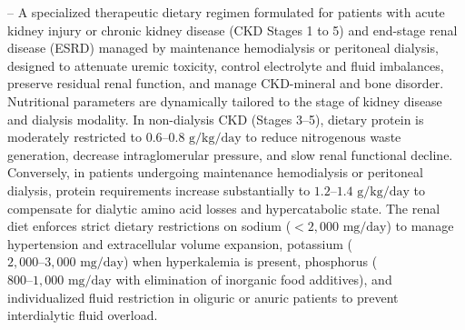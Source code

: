 -- A specialized therapeutic dietary regimen formulated for patients with acute kidney injury or chronic kidney disease (CKD Stages 1 to 5) and end-stage renal disease (ESRD) managed by maintenance hemodialysis or peritoneal dialysis, designed to attenuate uremic toxicity, control electrolyte and fluid imbalances, preserve residual renal function, and manage CKD-mineral and bone disorder. Nutritional parameters are dynamically tailored to the stage of kidney disease and dialysis modality. In non-dialysis CKD (Stages 3--5), dietary protein is moderately restricted to $0.6\text{--}0.8\text{ g/kg/day}$ to reduce nitrogenous waste generation, decrease intraglomerular pressure, and slow renal functional decline. Conversely, in patients undergoing maintenance hemodialysis or peritoneal dialysis, protein requirements increase substantially to $1.2\text{--}1.4\text{ g/kg/day}$ to compensate for dialytic amino acid losses and hypercatabolic state. The renal diet enforces strict dietary restrictions on sodium ($<2{,}000\text{ mg/day}$) to manage hypertension and extracellular volume expansion, potassium ($2{,}000\text{--}3{,}000\text{ mg/day}$) when hyperkalemia is present, phosphorus ($800\text{--}1{,}000\text{ mg/day}$ with elimination of inorganic food additives), and individualized fluid restriction in oliguric or anuric patients to prevent interdialytic fluid overload.

